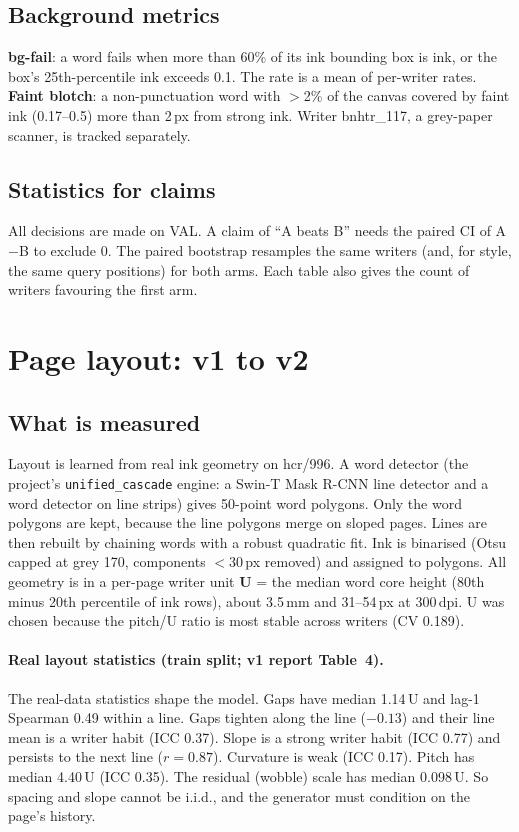 \documentclass[10.5pt,a4paper]{article}
\newcommand{\U}{\,U}
\begin{document}
\subsection{Background metrics}
\textbf{bg-fail}: a word fails when more than 60\% of its ink bounding box is ink, or the box's 25th-percentile ink exceeds
0.1. The rate is a mean of per-writer rates. \textbf{Faint blotch}: a non-punctuation word with $>$2\% of the canvas covered
by faint ink (0.17--0.5) more than 2\,px from strong ink. Writer bnhtr\_117, a grey-paper scanner, is tracked separately.

\subsection{Statistics for claims}
All decisions are made on VAL. A claim of ``A beats B'' needs the paired CI of A$-$B to exclude 0. The paired bootstrap
resamples the same writers (and, for style, the same query positions) for both arms. Each table also gives the count of
writers favouring the first arm.

\section{Page layout: v1 to v2}
\label{sec:layout}

\subsection{What is measured}
Layout is learned from real ink geometry on hcr/996. A word detector (the project's \texttt{unified\_cascade} engine: a
Swin-T Mask R-CNN line detector and a word detector on line strips) gives 50-point word polygons. Only the word polygons are
kept, because the line polygons merge on sloped pages. Lines are then rebuilt by chaining words with a robust quadratic fit.
Ink is binarised (Otsu capped at grey 170, components $<$30\,px removed) and assigned to polygons. All geometry is in a
per-page writer unit \textbf{U} = the median word core height (80th minus 20th percentile of ink rows), about 3.5\,mm and
31--54\,px at 300\,dpi. U was chosen because the pitch/U ratio is most stable across writers (CV 0.189).

\paragraph{Real layout statistics (train split; v1 report Table~4).} The real-data statistics shape the model. Gaps
have median 1.14\U{} and lag-1 Spearman 0.49 within a line. Gaps tighten along the line ($-0.13$) and their line mean is a
writer habit (ICC 0.37). Slope is a strong writer habit (ICC 0.77) and persists to the next line ($r=0.87$). Curvature is
weak (ICC 0.17). Pitch has median 4.40\U{} (ICC 0.35). The residual (wobble) scale has median 0.098\U. So spacing and slope
cannot be i.i.d., and the generator must condition on the page's history.
\end{document}
